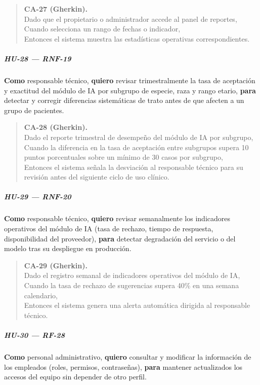 \documentclass[
]{article}
\begin{document}
\begin{quote}
\textbf{CA-27 (Gherkin).} \\
Dado que el propietario o administrador accede al panel de reportes, \\
Cuando selecciona un rango de fechas o indicador, \\
Entonces el sistema muestra las estadísticas operativas correspondientes.
\end{quote}
\subparagraph{HU-28 --- RNF-19}
\textbf{Como} responsable técnico,
\textbf{quiero} revisar trimestralmente la tasa de aceptación y exactitud del módulo de IA por subgrupo de especie, raza y rango etario,
\textbf{para} detectar y corregir diferencias sistemáticas de trato antes de que afecten a un grupo de pacientes.

\begin{quote}
\textbf{CA-28 (Gherkin).} \\
Dado el reporte trimestral de desempeño del módulo de IA por subgrupo, \\
Cuando la diferencia en la tasa de aceptación entre subgrupos supera 10 puntos porcentuales sobre un mínimo de 30 casos por subgrupo, \\
Entonces el sistema señala la desviación al responsable técnico para su revisión antes del siguiente ciclo de uso clínico.
\end{quote}

\subparagraph{HU-29 --- RNF-20}
\textbf{Como} responsable técnico,
\textbf{quiero} revisar semanalmente los indicadores operativos del módulo de IA (tasa de rechazo, tiempo de respuesta, disponibilidad del proveedor),
\textbf{para} detectar degradación del servicio o del modelo tras su despliegue en producción.

\begin{quote}
\textbf{CA-29 (Gherkin).} \\
Dado el registro semanal de indicadores operativos del módulo de IA, \\
Cuando la tasa de rechazo de sugerencias supera 40\% en una semana calendario, \\
Entonces el sistema genera una alerta automática dirigida al responsable técnico.
\end{quote}

\subparagraph{HU-30 --- RF-28}
\textbf{Como} personal administrativo,
\textbf{quiero} consultar y modificar la información de los empleados (roles, permisos, contraseñas),
\textbf{para} mantener actualizados los accesos del equipo sin depender de otro perfil.
\end{document}
